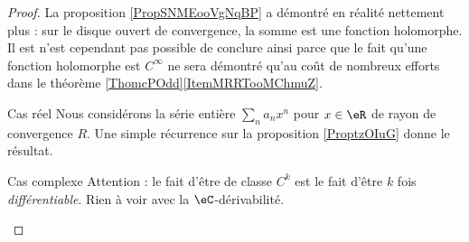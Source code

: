 \begin{proof}
    La proposition \ref{PropSNMEooVgNqBP} a démontré en réalité nettement plus : sur le disque ouvert de convergence, la somme est une fonction holomorphe. Il est n'est cependant pas possible de conclure ainsi parce que le fait qu'une fonction holomorphe est \( C^{\infty}\) ne sera démontré qu'au coût de nombreux efforts dans le théorème \ref{ThomcPOdd}\ref{ItemMRRTooMChmuZ}.

    \begin{subproof}
    \item[Cas réel]
        Nous considérons la série entière \( \sum_na_nx^n\) pour \( x\in \eR\) de rayon de convergence \( R\). Une simple récurrence sur la proposition \ref{ProptzOIuG} donne le résultat.
    \item[Cas complexe]
        Attention : le fait d'être de classe \( C^k\) est le fait d'être \( k\) fois \emph{différentiable}. Rien à voir avec la \( \eC\)-dérivabilité.


\end{subproof}
\end{proof}
